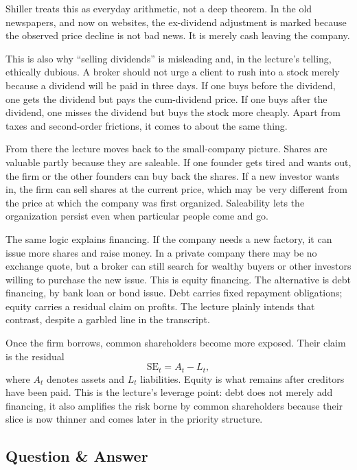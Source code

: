 Shiller treats this as everyday arithmetic, not a deep theorem. In the old newspapers, and now on websites, the ex-dividend adjustment is marked because the observed price decline is not bad news. It is merely cash leaving the company.

This is also why ``selling dividends'' is misleading and, in the lecture's telling, ethically dubious. A broker should not urge a client to rush into a stock merely because a dividend will be paid in three days. If one buys before the dividend, one gets the dividend but pays the cum-dividend price. If one buys after the dividend, one misses the dividend but buys the stock more cheaply. Apart from taxes and second-order frictions, it comes to about the same thing.

From there the lecture moves back to the small-company picture. Shares are valuable partly because they are saleable. If one founder gets tired and wants out, the firm or the other founders can buy back the shares. If a new investor wants in, the firm can sell shares at the current price, which may be very different from the price at which the company was first organized. Saleability lets the organization persist even when particular people come and go.

The same logic explains financing. If the company needs a new factory, it can issue more shares and raise money. In a private company there may be no exchange quote, but a broker can still search for wealthy buyers or other investors willing to purchase the new issue. This is equity financing. The alternative is debt financing, by bank loan or bond issue. Debt carries fixed repayment obligations; equity carries a residual claim on profits. The lecture plainly intends that contrast, despite a garbled line in the transcript.

Once the firm borrows, common shareholders become more exposed. Their claim is the residual
\begin{equation}
\mathrm{SE}_t = A_t - L_t,
\end{equation}
where $A_t$ denotes assets and $L_t$ liabilities. Equity is what remains after creditors have been paid. This is the lecture's leverage point: debt does not merely add financing, it also amplifies the risk borne by common shareholders because their slice is now thinner and comes later in the priority structure.

\subsection{Question \& Answer}

